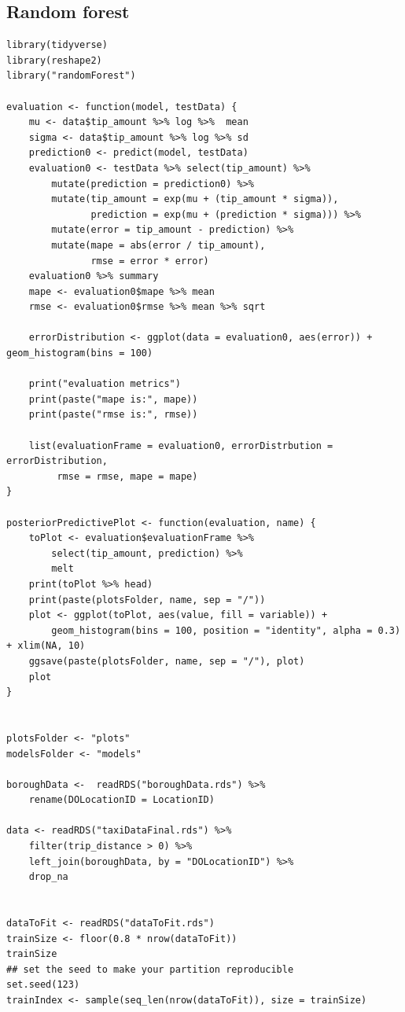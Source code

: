 \documentclass[11pt]{article}
\begin{document}
\subsection{Random forest}
\label{sec:org4768447}
\begin{verbatim}
library(tidyverse)
library(reshape2)
library("randomForest")

evaluation <- function(model, testData) {
    mu <- data$tip_amount %>% log %>%  mean
    sigma <- data$tip_amount %>% log %>% sd
    prediction0 <- predict(model, testData)
    evaluation0 <- testData %>% select(tip_amount) %>%
        mutate(prediction = prediction0) %>%
        mutate(tip_amount = exp(mu + (tip_amount * sigma)),
               prediction = exp(mu + (prediction * sigma))) %>%
        mutate(error = tip_amount - prediction) %>%
        mutate(mape = abs(error / tip_amount),
               rmse = error * error)
    evaluation0 %>% summary
    mape <- evaluation0$mape %>% mean
    rmse <- evaluation0$rmse %>% mean %>% sqrt

    errorDistribution <- ggplot(data = evaluation0, aes(error)) + geom_histogram(bins = 100)

    print("evaluation metrics")
    print(paste("mape is:", mape))
    print(paste("rmse is:", rmse))

    list(evaluationFrame = evaluation0, errorDistrbution = errorDistribution,
         rmse = rmse, mape = mape)
}

posteriorPredictivePlot <- function(evaluation, name) {
    toPlot <- evaluation$evaluationFrame %>%
        select(tip_amount, prediction) %>%
        melt
    print(toPlot %>% head)
    print(paste(plotsFolder, name, sep = "/"))
    plot <- ggplot(toPlot, aes(value, fill = variable)) +
        geom_histogram(bins = 100, position = "identity", alpha = 0.3) + xlim(NA, 10)
    ggsave(paste(plotsFolder, name, sep = "/"), plot)
    plot
}


plotsFolder <- "plots"
modelsFolder <- "models"

boroughData <-  readRDS("boroughData.rds") %>%
    rename(DOLocationID = LocationID)

data <- readRDS("taxiDataFinal.rds") %>%
    filter(trip_distance > 0) %>%
    left_join(boroughData, by = "DOLocationID") %>%
    drop_na


dataToFit <- readRDS("dataToFit.rds")
trainSize <- floor(0.8 * nrow(dataToFit))
trainSize
## set the seed to make your partition reproducible
set.seed(123)
trainIndex <- sample(seq_len(nrow(dataToFit)), size = trainSize)


\end{verbatim}
\end{document}
